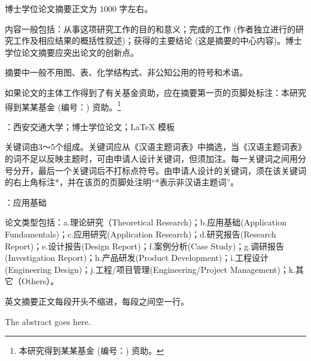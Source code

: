 
\setcounter{page}{1}

博士学位论文摘要正文为 1000 字左右。

内容一般包括：从事这项研究工作的目的和意义；完成的工作 (作者独立进行的研究工作及相应结果的概括性叙述)；获得的主要结论 (这是摘要的中心内容)。博士学位论文摘要应突出论文的创新点。

摘要中一般不用图、表、化学结构式、非公知公用的符号和术语。

如果论文的主体工作得到了有关基金资助，应在摘要第一页的页脚处标注：本研究得到某某基金 (编号：) 资助。\footnote{本研究得到某某基金 (编号：) 资助。}


\vspace{\baselineskip}
：西安交通大学；博士学位论文；\LaTeX{} 模板

{\color{red} 关键词由3～5个组成。关键词应从《汉语主题词表》中摘选，当《汉语主题词表》的词不足以反映主题时，可由申请人设计关键词，但须加注。每一关键词之间用分号分开，最后一个关键词后不打标点符号。由申请人设计的关键词，须在该关键词的右上角标注*，并在该页的页脚处注明“*表示非汉语主题词”。}

\vspace{\baselineskip}
：应用基础

{\color{red} 论文类型包括：a.理论研究（Theoretical Research)；b.应用基础(Application Fundamentals)；c.应用研究(Application Research)；d.研究报告(Research Report)；e.设计报告(Design Report)；f.案例分析(Case Study)；g.调研报告(Investigation Report)；h.产品研发(Product Development)；i.工程设计(Engineering Design)；j.工程/项目管理(Engineering/Project Management)；k.其它（Others）。}

\clearpage


\noindent 英文摘要正文每段开头不缩进，每段之间空一行。\newline

\noindent The abstract goes here. \newline

